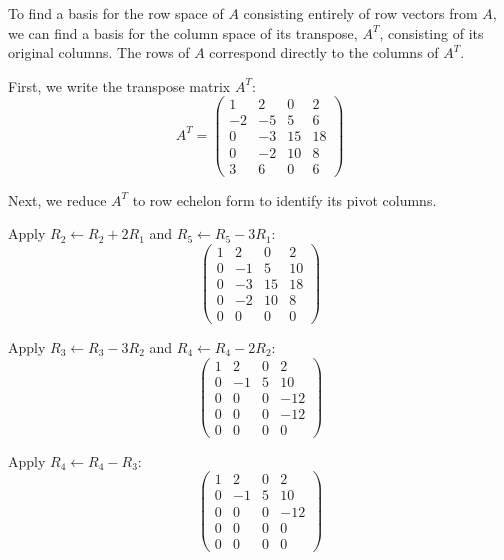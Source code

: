 \documentclass[12pt,a3paper]{article}
\begin{document}
\begin{tcolorbox}[enhanced,breakable,
  colback=cC!4,colframe=cC,boxrule=0.8pt,arc=5pt,
  title={\textbf{Answer --- Basis for the Row Space}},
  fonttitle=\bfseries\color{white},colbacktitle=cC]

To find a basis for the row space of $A$ consisting entirely of row vectors from $A$, we can find a basis for the column space of its transpose, $A^T$, consisting of its original columns. The rows of $A$ correspond directly to the columns of $A^T$.

First, we write the transpose matrix $A^T$:
\[
A^T = \begin{pmatrix}
1 & 2 & 0 & 2 \\
-2 & -5 & 5 & 6 \\
0 & -3 & 15 & 18 \\
0 & -2 & 10 & 8 \\
3 & 6 & 0 & 6
\end{pmatrix}
\]

Next, we reduce $A^T$ to row echelon form to identify its pivot columns.

Apply $R_2 \leftarrow R_2 + 2R_1$ and $R_5 \leftarrow R_5 - 3R_1$:
\[
\begin{pmatrix}
1 & 2 & 0 & 2 \\
0 & -1 & 5 & 10 \\
0 & -3 & 15 & 18 \\
0 & -2 & 10 & 8 \\
0 & 0 & 0 & 0
\end{pmatrix}
\]

Apply $R_3 \leftarrow R_3 - 3R_2$ and $R_4 \leftarrow R_4 - 2R_2$:
\[
\begin{pmatrix}
1 & 2 & 0 & 2 \\
0 & -1 & 5 & 10 \\
0 & 0 & 0 & -12 \\
0 & 0 & 0 & -12 \\
0 & 0 & 0 & 0
\end{pmatrix}
\]

Apply $R_4 \leftarrow R_4 - R_3$:
\[
\begin{pmatrix}
1 & 2 & 0 & 2 \\
0 & -1 & 5 & 10 \\
0 & 0 & 0 & -12 \\
0 & 0 & 0 & 0 \\
0 & 0 & 0 & 0
\end{pmatrix}
\]


\end{tcolorbox}
\end{document}
